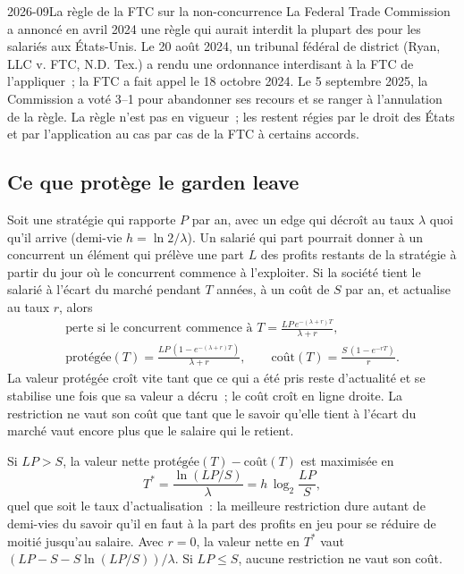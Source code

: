 \begin{dated}{2026-09}{La règle de la FTC sur la non-concurrence}\label{dat:fm:intellectual-property-and-non-competes:ftc}
La Federal Trade Commission a annoncé en avril 2024 une règle qui aurait interdit la plupart des  pour les salariés aux États-Unis. Le
20 août 2024, un tribunal fédéral de district (Ryan, LLC v. FTC, N.D. Tex.) a rendu une ordonnance interdisant à la FTC de l'appliquer~; la FTC a fait appel le 18
octobre 2024. Le 5 septembre 2025, la Commission a voté 3--1 pour abandonner ses recours et se ranger à l'annulation de la règle. La règle
n'est pas en vigueur~; les  restent régies par le droit des États et par l'application au cas par cas de la FTC à certains accords.
\end{dated}

\subsection{Ce que protège le garden leave}

Soit une stratégie qui rapporte $P$ par an, avec un edge qui décroît au taux $\lambda$ quoi qu'il arrive (demi-vie $h=\ln2/\lambda$). Un salarié qui part
pourrait donner à un concurrent un élément qui prélève une part $L$ des profits restants de la stratégie à partir du jour où le concurrent commence à l'exploiter. Si la
société tient le salarié à l'écart du marché pendant $T$ années, à un coût de $S$ par an, et actualise au taux $r$, alors
\begin{gather*}
\text{perte si le concurrent commence à } T = \frac{LP\,e^{-(\lambda+r)T}}{\lambda+r},\\
\text{protégée}(T)=\frac{LP\,(1-e^{-(\lambda+r)T})}{\lambda+r},\qquad \text{coût}(T)=\frac{S\,(1-e^{-rT})}{r}.
\end{gather*}
La valeur protégée croît vite tant que ce qui a été pris reste d'actualité et se stabilise une fois que sa valeur a décru~; le coût croît en ligne droite. La
restriction ne vaut son coût que tant que le savoir qu'elle tient à l'écart du marché vaut encore plus que le salaire qui le retient.

\begin{proposition}\label{prop:fm:intellectual-property-and-non-competes:six}
Si $LP>S$, la valeur nette $\text{protégée}(T)-\text{coût}(T)$ est maximisée en
\[
T^*=\frac{\ln(LP/S)}{\lambda}=h\,\log_2\frac{LP}{S},
\]
quel que soit le taux d'actualisation~: la meilleure restriction dure autant de demi-vies du savoir qu'il en faut à la part des profits en jeu pour se réduire de moitié
jusqu'au salaire. Avec $r=0$, la valeur nette en $T^*$ vaut $(LP-S-S\ln(LP/S))/\lambda$. Si $LP\le S$, aucune restriction ne vaut son coût.
\end{proposition}

